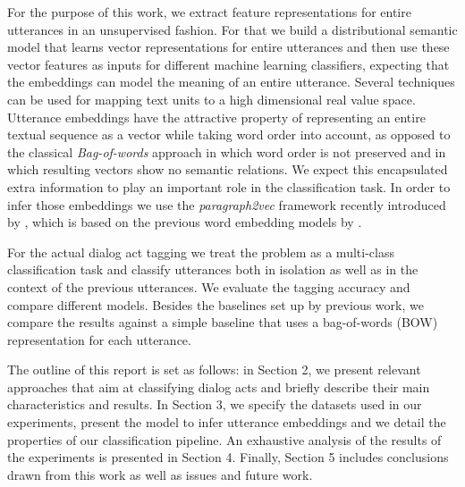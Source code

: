 For the purpose of this work, we extract feature representations for entire utterances in an unsupervised fashion.
For that we build a distributional semantic model that learns vector representations for entire utterances and then use these vector features as inputs for different machine learning classifiers, expecting that the embeddings can model the meaning of an entire utterance.
Several techniques can be used for mapping text units to a high dimensional real value space.
Utterance embeddings have the attractive property of representing an entire textual sequence as a vector while taking word order into account, as opposed to the classical \emph{Bag-of-words} approach in which word order is not preserved and in which resulting vectors show no semantic relations.
We expect this encapsulated extra information to play an important role in the classification task. In order to infer those embeddings we use the \emph{paragraph2vec} framework recently introduced by \cite{le2014distributed}, which is based on the previous word embedding models by \cite{mikolov2013efficient}.

For the actual dialog act tagging we treat the problem as a multi-class classification task and classify utterances both in isolation as well as in the context of the previous utterances. We evaluate the tagging accuracy and compare different models. Besides the baselines set up by previous work, we compare the results against a simple baseline that uses a bag-of-words (BOW) representation for each utterance. 

The outline of this report is set as follows: in Section 2, we present relevant approaches that aim at classifying dialog acts and briefly describe their main characteristics and results. In Section 3, we specify the datasets used in our experiments, present the model to infer utterance embeddings and we detail the properties of our classification pipeline. An exhaustive analysis of the results of the experiments is presented in Section 4. Finally, Section 5 includes conclusions drawn from this work as well as issues and future work. 